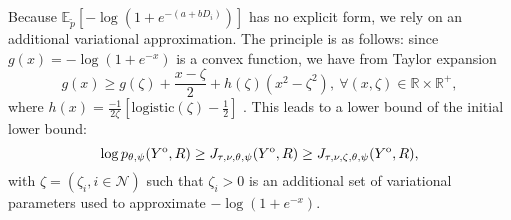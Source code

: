 \documentclass[10pt]{article}
\newcommand{\1}{\mathds{1}}
\newcommand{\MA}{Y}
\newcommand{\MAO}{\MA^\text{\rm o}}
\newcommand{\node}{\mathcal{N}}
\begin{document}
Because $\mathbb{E}_{\tilde{p}}\left[  -\log(1+e^{-(a+bD_i)}) \right]$
has  no   explicit  form,  we   rely  on  an   additional  variational
approximation.   The principle  is as  follows: since
$g(x) =  -\log(1+e^{-x})$ is  a convex function,  we have  from Taylor
expansion
\begin{equation}\nonumber
g(x) \geq g(\zeta) + \frac{x-\zeta}{2} + h(\zeta)(x^2
- \zeta^2), \ \forall (x,\zeta) \in \mathbb{R}\times\mathbb{R}^{+}, 
\end{equation}
where
$h(x) =  \frac{-1}{2\zeta}\left[ \text{logistic}(\zeta)  - \frac{1}{2}
\right]$ .  This leads to a lower bound of the initial lower bound:
\begin{equation}
  \label{eq:lower_bound_degree}
  \log p_{\theta,\psi}(\MAO,R)  \geq
  J_{\tau,\nu,\theta,\psi}(\MAO,R) \geq
  J_{\tau,\nu,\zeta,\theta,\psi}(\MAO,R),
\end{equation}
with $\zeta = \left(  \zeta_i, i\in\node\right)$ such that $\zeta_i>0$
is an  additional set  of variational  parameters used  to approximate
$-\log(1+e^{-x})$.
\end{document}
